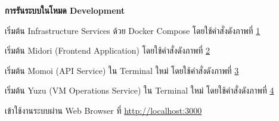 \vspace{0.5em}
\textbf{การรันระบบในโหมด Development}
\vspace{0.5em}

\begin{mycustomenum2}
    \item เริ่มต้น Infrastructure Services ด้วย Docker Compose โดยใช้คำสั่งดังภาพที่ \ref{figC:DockerUp}

\begin{figure}[htbp]
\centering
{}
\caption{}
\label{figC:DockerUp}
\end{figure}

    \item เริ่มต้น Midori (Frontend Application) โดยใช้คำสั่งดังภาพที่ \ref{figC:MidoriDev}

\begin{figure}[htbp]
\centering
{}
\caption{}
\label{figC:MidoriDev}
\end{figure}

    \item เริ่มต้น Momoi (API Service) ใน Terminal ใหม่ โดยใช้คำสั่งดังภาพที่ \ref{figC:MomoiDev}

\begin{figure}[htbp]
\centering
{}
\caption{}
\label{figC:MomoiDev}
\end{figure}

    \item เริ่มต้น Yuzu (VM Operations Service) ใน Terminal ใหม่ โดยใช้คำสั่งดังภาพที่ \ref{figC:YuzuDev}

\begin{figure}[htbp]
\centering
{}
\caption{}
\label{figC:YuzuDev}
\end{figure}

    \item เข้าใช้งานระบบผ่าน Web Browser ที่ \url{http://localhost:3000}
\end{mycustomenum2}

